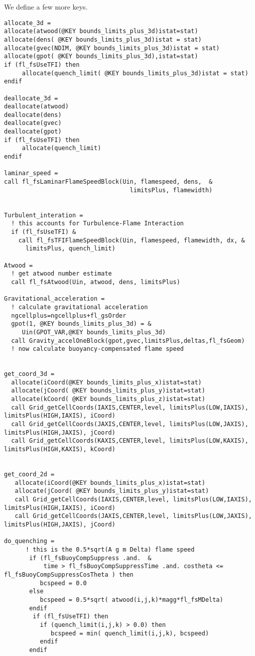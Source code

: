 \documentclass{article}
\begin{document}
We define a few more keys.
\begin{verbatim}
allocate_3d =
allocate(atwood(@KEY bounds_limits_plus_3d)istat=stat)
allocate(dens( @KEY bounds_limits_plus_3d)istat = stat)
allocate(gvec(NDIM, @KEY bounds_limits_plus_3d)istat = stat)
allocate(gpot( @KEY bounds_limits_plus_3d),istat=stat)
if (fl_fsUseTFI) then
     allocate(quench_limit( @KEY bounds_limits_plus_3d)istat = stat)
endif

deallocate_3d =
deallocate(atwood)
deallocate(dens)
deallocate(gvec)
deallocate(gpot)
if (fl_fsUseTFI) then
     allocate(quench_limit)
endif

laminar_speed =
call fl_fsLaminarFlameSpeedBlock(Uin, flamespeed, dens,  &
                                   limitsPlus, flamewidth)


Turbulent_interation =
  ! this accounts for Turbulence-Flame Interaction
  if (fl_fsUseTFI) &
    call fl_fsTFIFlameSpeedBlock(Uin, flamespeed, flamewidth, dx, &
      limitsPlus, quench_limit)

Atwood =
  ! get atwood number estimate
  call fl_fsAtwood(Uin, atwood, dens, limitsPlus)

Gravitational_acceleration =
  ! calculate gravitational acceleration
  ngcellplus=ngcellplus+fl_gsOrder
  gpot(1, @KEY bounds_limits_plus_3d) = &
     Uin(GPOT_VAR,@KEY bounds_limits_plus_3d)
  call Gravity_accelOneBlock(gpot,gvec,limitsPlus,deltas,fl_fsGeom)
  ! now calculate buoyancy-compensated flame speed


get_coord_3d =
  allocate(iCoord(@KEY bounds_limits_plus_x)istat=stat)
  allocate(jCoord( @KEY bounds_limits_plus_y)istat=stat)
  allocate(kCoord( @KEY bounds_limits_plus_z)istat=stat)
  call Grid_getCellCoords(IAXIS,CENTER,level, limitsPlus(LOW,IAXIS), limitsPlus(HIGH,IAXIS), iCoord)
  call Grid_getCellCoords(JAXIS,CENTER,level, limitsPlus(LOW,JAXIS), limitsPlus(HIGH,JAXIS), jCoord)
  call Grid_getCellCoords(KAXIS,CENTER,level, limitsPlus(LOW,KAXIS), limitsPlus(HIGH,KAXIS), kCoord)


get_coord_2d =
   allocate(iCoord(@KEY bounds_limits_plus_x)istat=stat)
   allocate(jCoord( @KEY bounds_limits_plus_y)istat=stat)
   call Grid_getCellCoords(IAXIS,CENTER,level, limitsPlus(LOW,IAXIS), limitsPlus(HIGH,IAXIS), iCoord)
   call Grid_getCellCoords(JAXIS,CENTER,level, limitsPlus(LOW,JAXIS), limitsPlus(HIGH,JAXIS), jCoord)

do_quenching =
      ! this is the 0.5*sqrt(A g m Delta) flame speed
       if (fl_fsBuoyCompSuppress .and.  &
           time > fl_fsBuoyCompSuppressTime .and. costheta <= fl_fsBuoyCompSuppressCosTheta ) then
          bcspeed = 0.0
       else
          bcspeed = 0.5*sqrt( atwood(i,j,k)*magg*fl_fsMDelta)
       endif
        if (fl_fsUseTFI) then
          if (quench_limit(i,j,k) > 0.0) then
             bcspeed = min( quench_limit(i,j,k), bcspeed)
          endif
       endif


\end{verbatim}
\end{document}
